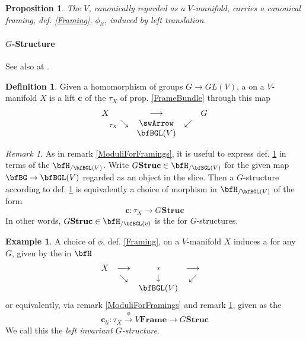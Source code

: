 \documentclass[12pt,titlepage]{article}
\def\mathllap{\mathpalette\mathllapinternal}
\def\mathllapinternal#1#2{\llap{$\mathsurround=0pt#1{#2}$}}
\newcommand{\itexarray}[1]{\begin{matrix}#1\end{matrix}}
\theoremstyle{plain}
\newtheorem{prop}{Proposition}
\theoremstyle{definition}
\newtheorem{defn}{Definition}
\newtheorem{example}{Example}
\theoremstyle{remark}
\newtheorem{remark}{Remark}
\begin{document}
\begin{prop}
\label{LeftTranslationFraming}\hypertarget{LeftTranslationFraming}{}
The  $V$, canonically regarded as a $V$-manifold, carries a canonical framing, def. \ref{Framing}, $\phi_{li}$, induced by left translation.
\end{prop}
\hypertarget{GStructure}{}\paragraph*{{$G$-Structure}}\label{GStructure}
See also at .
\begin{defn}
\label{GStructure}\hypertarget{GStructure}{}
Given a homomorphism of groups $G \longrightarrow GL(V)$, a  on a $V$-manifold $X$ is a lift $\mathbf{c}$ of the  $\tau_X$ of prop. \ref{FrameBundle} through this map
\begin{displaymath}
\itexarray{
X && \stackrel{}{\longrightarrow} && G
\\
& {}_{\mathllap{\tau_X}}\searrow &\swArrow& \swarrow
\\
&& \bfBGL(V)
}
\end{displaymath}
\end{defn}
\begin{remark}
\label{ModuliForGStructures}\hypertarget{ModuliForGStructures}{}
As in remark \ref{ModuliForFramings}, it is useful to express def. \ref{GStructure} in terms of the  $\bfH_{/\bfBGL(V)}$. Write $G\mathbf{Struc}\in \bfH_{/\bfBGL(V)}$ for the given map $\bfBG\to \bfBGL(V)$ regarded as an object in the slice. Then a $G$-structure according to def. \ref{GStructure} is equivalently a choice of morphism in $\bfH_{/\bfBGL(V)}$ of the form
\begin{displaymath}
\mathbf{c} \colon \tau_X \longrightarrow G\mathbf{Struc}
\end{displaymath}
In other words, $G\mathbf{Struc} \in \bfH_{/\bfBGL(v)}$ is the  for $G$-structures.
\end{remark}
\begin{example}
\label{GStructureFromLeftTranslationFraming}\hypertarget{GStructureFromLeftTranslationFraming}{}
A choice of  $\phi$, def. \ref{Framing}, on a $V$-manifold $X$ induces a  for any $G$, given by the  in $\bfH$
\begin{displaymath}
\itexarray{
X &\longrightarrow& \ast &\longrightarrow&
\\
& \searrow & \downarrow & \swarrow
\\
&& \bfBGL(V)
}
\end{displaymath}
or equivalently, via remark \ref{ModuliForFramings} and remark \ref{ModuliForGStructures}, given as the 
\begin{displaymath}
\mathbf{c}_{li}
\colon
\tau_X \stackrel{\phi}{\longrightarrow} V\mathbf{Frame} \longrightarrow G\mathbf{Struc}\end{displaymath}
We call this the \emph{left invariant $G$-structure}.
\end{example}
\end{document}
